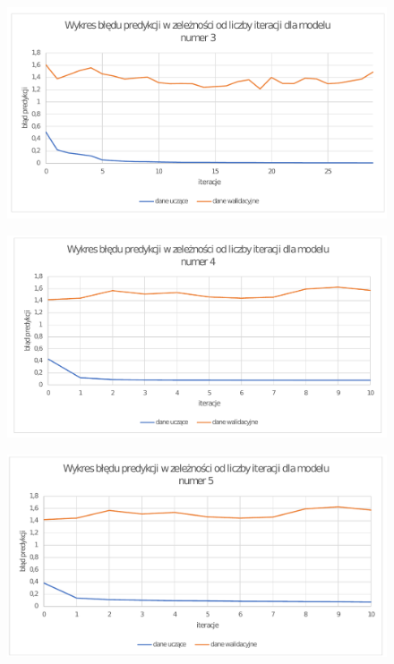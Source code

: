 \documentclass[12pt,oneside,a4paper]{report}
\begin{document}
\begin{figure}[!ht]
  \centering
  \includegraphics[width=1\textwidth]{./img/model3.pdf}
\end{figure}

\begin{figure}[!ht]
  \centering
  \includegraphics[width=1\textwidth]{./img/model4.pdf}
\end{figure}
\begin{figure}[!ht]
  \centering
  \includegraphics[width=1\textwidth]{./img/model5.pdf}
\end{figure}
\end{document}
